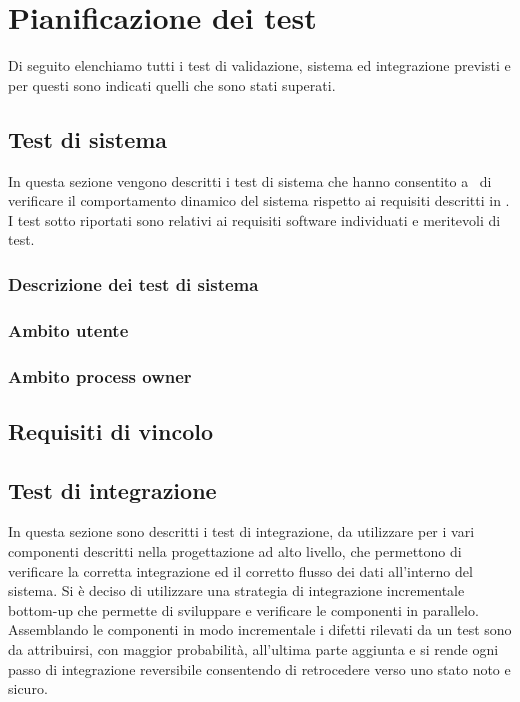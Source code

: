 \section{Pianificazione dei test}
Di seguito elenchiamo tutti i test di validazione, sistema ed integrazione previsti e per questi sono indicati quelli che sono stati superati. 
\subsection{Test di sistema}
In questa sezione vengono descritti i test di sistema che hanno consentito a \gruppo ~di verificare il comportamento dinamico del sistema rispetto ai requisiti descritti in \infoAR. I test sotto riportati sono relativi ai requisiti software individuati e meritevoli di test.
\subsubsection{Descrizione dei test di sistema}
\subsubsection{Ambito utente}
\subsubsection{Ambito process owner}
\subsection{Requisiti di vincolo}
\subsection{Test di integrazione}
In questa sezione sono descritti i test di integrazione, da utilizzare per i vari componenti descritti nella progettazione ad alto livello, che permettono di verificare la corretta integrazione ed il corretto flusso dei dati all'interno del sistema.
Si è deciso di utilizzare una strategia di integrazione incrementale bottom-up che permette di sviluppare e verificare le componenti in parallelo.\\
Assemblando le componenti in modo incrementale i difetti rilevati da un test sono da
attribuirsi, con maggior probabilità, all'ultima parte aggiunta e si rende ogni passo di
integrazione reversibile consentendo di retrocedere verso uno stato noto e sicuro.
